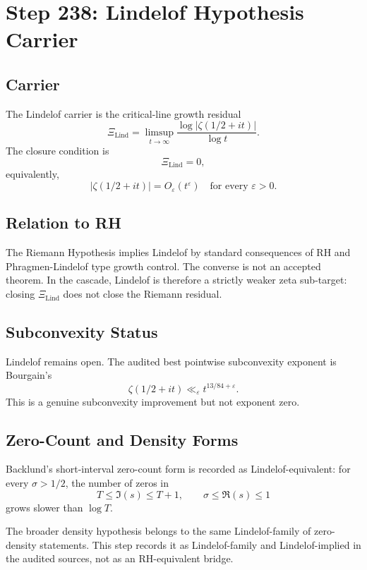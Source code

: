 \section*{Step 238: Lindelof Hypothesis Carrier}

\subsection*{Carrier}

The Lindelof carrier is the critical-line growth residual
\[
\Xi_{\mathrm{Lind}} =
\limsup_{t\to\infty}
\frac{\log |\zeta(1/2+it)|}{\log t}.
\]
The closure condition is
\[
\Xi_{\mathrm{Lind}} = 0,
\]
equivalently,
\[
|\zeta(1/2+it)| = O_\varepsilon(t^\varepsilon)
\quad \text{for every } \varepsilon>0.
\]

\subsection*{Relation to RH}

The Riemann Hypothesis implies Lindelof by standard consequences of RH and Phragmen-Lindelof type growth control. The converse is not an accepted theorem. In the cascade, Lindelof is therefore a strictly weaker zeta sub-target: closing $\Xi_{\mathrm{Lind}}$ does not close the Riemann residual.

\subsection*{Subconvexity Status}

Lindelof remains open. The audited best pointwise subconvexity exponent is Bourgain's
\[
\zeta(1/2+it) \ll_\varepsilon t^{13/84+\varepsilon}.
\]
This is a genuine subconvexity improvement but not exponent zero.

\subsection*{Zero-Count and Density Forms}

Backlund's short-interval zero-count form is recorded as Lindelof-equivalent: for every $\sigma>1/2$, the number of zeros in
\[
T \leq \Im(s) \leq T+1,\qquad \sigma \leq \Re(s) \leq 1
\]
grows slower than $\log T$.

The broader density hypothesis belongs to the same Lindelof-family of zero-density statements. This step records it as Lindelof-family and Lindelof-implied in the audited sources, not as an RH-equivalent bridge.

